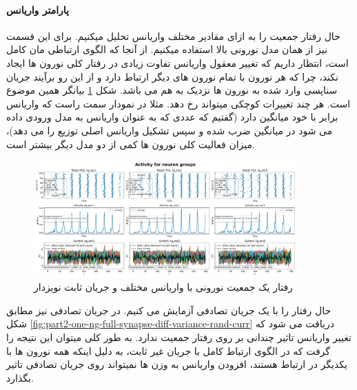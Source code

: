             \paragraph*{پارامتر واریانس}
                حال رفتار جمعیت را به ازای مقادیر مختلف واریانس تحلیل میکنیم. برای این قسمت نیز از همان مدل نورونی بالا استفاده میکنیم. از آنجا که الگوی ارتباطی مان کامل است، انتظار داریم که تغییر معقول واریانس تفاوت زیادی در رفتار کلی نورون ها ایجاد نکند، چرا که هر نورون با تمام نورون های دیگر ارتباط دارد و از این رو برآیند جریان سناپسی وارد شده به نورون ها نزدیک به هم می باشد. شکل 
                \ref{fig:part2-one-ng-full-synapse-diff-variance}
                بیانگر همین موضوع است. هر چند تغییرات کوچکی میتواند رخ دهد. مثلا در نمودار سمت راست که واریانس برابر با خود میانگین دارد
                (گفتیم که عددی که به عنوان واریانس به مدل ورودی داده می شود در میانگین ضرب شده و سپس تشکیل واریانس اصلی توزیع را می دهد)،
                میزان فعالیت کلی نورون ها کمی از دو مدل دیگر بیشتر است.
                \begin{figure}[!ht]
                    \centering
                    \includegraphics[width=0.9\textwidth]{plots/part2-one-ng-full-synapse-diff-variance.pdf} 
                    \caption{رفتار یک جمعیت نورونی با واریانس مختلف و جریان ثابت نویزدار}
                    \label{fig:part2-one-ng-full-synapse-diff-variance}
                \end{figure}

                حال رفتار را با یک جریان تصادفی آزمایش می کنیم. در جریان تصادفی نیز مطابق شکل
                \ref{fig:part2-one-ng-full-synapse-diff-variance-rand-curr}
                دریافت می شود که تغییر واریانس تاثیر چندانی بر روی رفتار جمعیت ندارد. به طور کلی میتوان این نتیجه را گرفت که در الگوی ارتباط کامل با جریان غیر ثابت، به دلیل اینکه همه نورون ها با یکدیگر در ارتباط هستند، افزودن واریانس به وزن ها نمیتواند روی جریان تصادفی تاثیر بگذارد.

